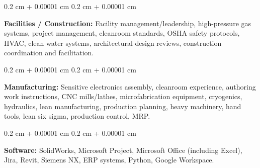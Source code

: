 \documentclass[10pt, letterpaper]{article}
\newenvironment{onecolentry}{
    \begin{adjustwidth}{
        0.2 cm + 0.00001 cm
    }{
        0.2 cm + 0.00001 cm
    }
}{
    \end{adjustwidth}
} %
\begin{document}
        \vspace{0.2 cm}
        
        \begin{onecolentry}
            \textbf{Facilities / Construction:} Facility management/leadership, high-pressure gas systems, project management, cleanroom standards, OSHA safety protocols, HVAC, clean water systems, architectural design reviews, construction coordination and facilitation.
        \end{onecolentry}

        \vspace{0.2 cm}

        \begin{onecolentry}
            \textbf{Manufacturing:} Sensitive electronics assembly, cleanroom experience, authoring work instructions, CNC mills/lathes, microfabrication equipment, cryogenics, hydraulics, lean manufacturing, production planning, heavy machinery, hand tools, lean six sigma, production control, MRP.
        \end{onecolentry}

        \vspace{0.2 cm}

        \begin{onecolentry}
            \textbf{Software:} SolidWorks, Microsoft Project, Microsoft Office (including Excel), Jira, Revit, Siemens NX, ERP systems, Python, Google Workspace.
        \end{onecolentry}


    
\end{document}
